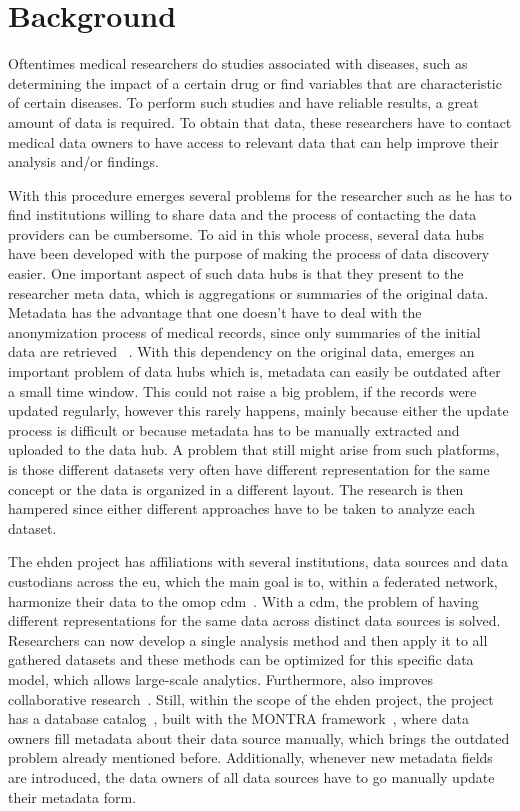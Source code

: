 \chapter{Background}
\label{chapter:background}

Oftentimes medical researchers do studies associated with diseases, such as determining the impact of a certain drug or find variables that are characteristic of certain diseases.
To perform such studies and have reliable results, a great amount of data is required.
To obtain that data, these researchers have to contact medical data owners to have access to relevant data that can help improve their analysis and/or findings.

With this procedure emerges several problems for the researcher such as he has to find
institutions willing to share data and the process of contacting the data providers can
be cumbersome.
To aid in this whole process, several data hubs have been developed with the purpose of
making the process of data discovery easier.
One important aspect of such data hubs is that they present to the researcher meta
data, which is aggregations or summaries of the original data.
Metadata has the advantage that one doesn't have to deal with the anonymization process
of medical records, since only summaries of the initial data are retrieved
~\cite{egenvar, montra}.
With this dependency on the original data, emerges an important problem of data hubs
which is, metadata can easily be outdated after a small time window.
This could not raise a big problem, if the records were updated regularly, however this
rarely happens, mainly because either the update process is difficult or because
metadata has to be manually extracted and uploaded to the data hub.
A problem that still might arise from such platforms, is those different datasets very
often have different representation for the same concept or the data is organized in a
different layout.
The research is then hampered since either different approaches have to be taken to
analyze each dataset.

The \gls{ehden} project has affiliations with several institutions, data sources and
data custodians across the \gls{eu}, which the main goal is to, within a federated
network, harmonize their data to the \gls{omop} \gls{cdm}~\cite{ehden-datapartners}.
With a \gls{cdm}, the problem of having different representations for the same data
across distinct data sources is solved.
Researchers can now develop a single analysis method and then apply it to all gathered
datasets and these methods can be optimized for this specific data model, which allows
large-scale analytics.
Furthermore, also improves collaborative research~\cite{ohdsi-site}.
Still, within the scope of the \gls{ehden} project, the project has a database catalog~\cite{ehden-portal},
built with the MONTRA framework~\cite{montra}, where data owners fill metadata about
their data source manually, which brings the outdated problem already mentioned before.
Additionally, whenever new metadata fields are introduced, the data owners of all data
sources have to go manually update their metadata form.


